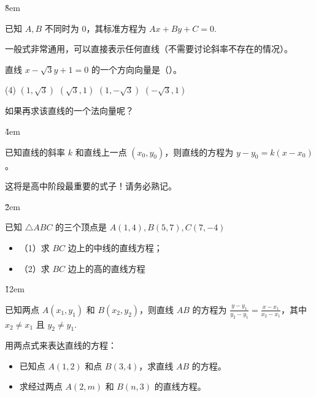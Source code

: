 \v{8em}

\begin{definition}[一般式]
    已知 $A, B$ 不同时为 $0$，其标准方程为 $Ax+By+C=0$.

    一般式非常通用，可以直接表示任何直线（不需要讨论斜率不存在的情况）。
\end{definition}

\begin{example}
    直线 $x-\sqrt{3} y+1=0$ 的一个方向向量是（\quad ）。
    \begin{tasks}(4)
        \task $(1, \sqrt{3})$
        \task $(\sqrt{3}, 1)$
        \task $(1, -\sqrt{3})$
        \task $(-\sqrt{3}, 1)$
    \end{tasks}
\end{example}

\begin{tips}
    如果再求该直线的一个法向量呢？
\end{tips}

\v{4em}

\begin{definition}[点斜式]
    已知直线的斜率 $k$ 和直线上一点 $(x_0, y_0)$，则直线的方程为 $y - y_0 = k(x - x_0)$。
\end{definition}

\begin{warning}
    这将是高中阶段最重要的式子！请务必熟记。
\end{warning}

\v{2em}

\begin{example}
    已知 $\triangle A B C$ 的三个顶点是 $A(1,4), B(5,7), C(7,-4)$
    \begin{itemize}
        \item （1）求 $B C$ 边上的中线的直线方程；
        \item （2）求 $B C$ 边上的高的直线方程
    \end{itemize}
\end{example}

\v{12em}

\begin{definition}[两点式]
    已知两点 $A(x_1, y_1)$ 和 $B(x_2, y_2)$，则直线 $AB$ 的方程为 $\frac{y-y_1}{y_2-y_1} = \frac{x-x_1}{x_2-x_1}$，其中 $x_2 \neq x_1$ 且 $y_2 \neq y_1$.
\end{definition}

\begin{example}
    用两点式来表达直线的方程：
    \begin{itemize}
        \item 已知点 $A(1,2)$ 和点 $B(3,4)$，求直线 $AB$ 的方程。
        \item 求经过两点 $A(2,m)$ 和 $B(n,3)$ 的直线方程。
    \end{itemize}
\end{example}

